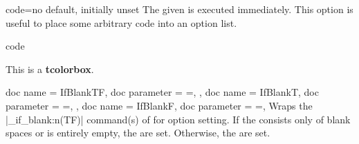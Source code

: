 \begin{docTcbKey}{code}{=}{no default, initially unset}
  The given  is executed immediately. This option is useful
  to place some arbitrary code into an option list.
\begin{exdispExample}{code}

\begin{tcolorbox}[code={\newcommand{\mycommand}{\textit{working}}},
  title=My \mycommand\ title]
This is a \textbf{tcolorbox}.
\end{tcolorbox}
\end{exdispExample}
\end{docTcbKey}

\clearpage

\begin{docTcbKeys}[doc description = {no default}, doc new = 2022-05-25 ]
  {
    {
      doc name        = IfBlankTF,
      doc parameter   = {=},
    },
    {
      doc name        = IfBlankT,
      doc parameter   = {=},
    },
    {
      doc name        = IfBlankF,
      doc parameter   = {=},
    }
  }
  Wraps the |\tl_if_blank:n(TF)| command(s) of  for option setting.
  If the  consists only of blank spaces or is entirely empty, the  are set.
  Otherwise, the  are set.
\end{docTcbKeys}

\medskip

